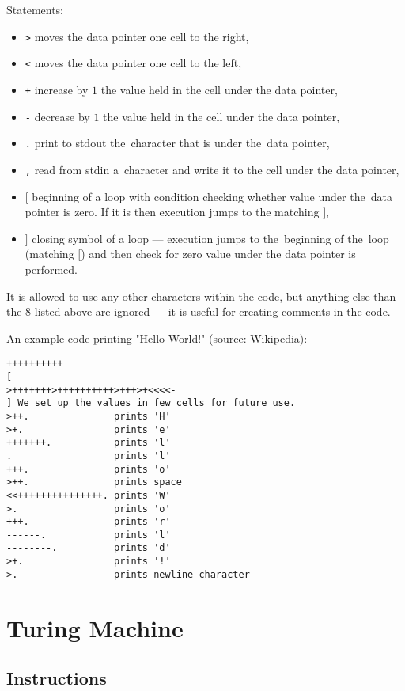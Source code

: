 \documentclass[english,shortabstract,mgr]{iithesis}
\begin{document}
Statements:
\begin{itemize}
  \item \texttt{>} moves the data pointer one cell to the right,
  \item \texttt{<} moves the data pointer one cell to the left,
  \item \texttt{+} increase by $1$ the value held in the cell under the data pointer,
  \item \texttt{-} decrease by $1$ the value held in the cell under the data pointer,
  \item \texttt{.} print to stdout the~character that is under the~data pointer,
  \item \texttt{,} read from stdin a~character and write it to the cell under the data pointer,
  \item \texttt{$[$} beginning of a loop with condition checking whether value under
      the~data pointer is zero. If it is then execution jumps to the matching $]$,
  \item \texttt{$]$} closing symbol of a loop --- execution jumps to the~beginning of the~loop
      (matching $[$) and then check for zero value under the data pointer is performed.
\end{itemize}

It is allowed to use any other characters within the code, but anything else than the $8$
listed above are ignored --- it is useful for creating comments in the code.

An example code printing "Hello World!" (source: \href{https://pl.wikipedia.org/wiki/Brainfuck#Przyk%C5%82ady}{Wikipedia}):
\begin{verbatim}
++++++++++
[
>+++++++>++++++++++>+++>+<<<<-
] We set up the values in few cells for future use.
>++.               prints 'H'
>+.                prints 'e'
+++++++.           prints 'l'
.                  prints 'l'
+++.               prints 'o'
>++.               prints space
<<+++++++++++++++. prints 'W'
>.                 prints 'o'
+++.               prints 'r'
------.            prints 'l'
--------.          prints 'd'
>+.                prints '!'
>.                 prints newline character
\end{verbatim}

\section {Turing Machine}

\subsection {Instructions}
\end{document}
